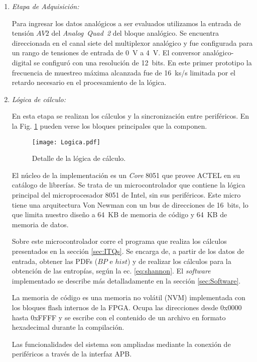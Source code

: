 \begin{enumerate}
	\item \textit{Etapa de Adquisición:}
	
	Para ingresar los datos analógicos a ser evaluados utilizamos la entrada de tensión $AV2$ del \textit{Analog~Quad~2} del bloque analógico.
	Se encuentra direccionada en el canal siete del multiplexor analógico y fue configurada para un rango de tensiones de entrada de 0~V a 4~V.
	El conversor analógico-digital se configuró con una resolución de 12~bits.
	En este primer prototipo la frecuencia de muestreo máxima alcanzada fue de 16~ks/s limitada por el retardo necesario en el procesamiento de la lógica.
	
	\item \textit{Lógica de cálculo:}
	
	En esta etapa se realizan los cálculos y la sincronización entre periféricos.
	En la Fig. \ref{fig:logica} pueden verse los bloques principales que la componen.
	\begin{figure}
		\centering
		\texttt{[image: Logica.pdf]}\\
		\caption{Detalle de la lógica de cálculo.}\label{fig:logica}
	\end{figure}
	
	El núcleo de la implementación es un \textit{Core} 8051 que provee ACTEL en su catálogo de librerías.
	Se trata de un microcontrolador que contiene la lógica principal del microprocesador 8051 de Intel, sin sus periféricos.
	Este micro tiene una arquitectura Von Newman con un bus de direcciones de 16~bits, lo que limita nuestro diseño a 64~KB de memoria de código y 64~KB de memoria de datos.
	
	Sobre este microcontrolador corre el programa que realiza los cálculos presentados en la sección \ref{sec:ITQs}.
	Se encarga de, a partir de los datos de entrada, obtener las PDFs ($BP$ e $hist$) y de realizar los cálculos para la obtención de las entropías, según la ec. \ref{eq:shannon}.
	El \textit{software} implementado se describe más detalladamente en la sección \ref{sec:Software}.
	
	La memoria de código es una memoria no volátil (NVM) implementada con los bloques flash internos de la FPGA.
	Ocupa las direcciones desde 0x0000 hasta 0xFFFF y se escribe con el contenido de un archivo en formato hexadecimal durante la compilación.
	
	Las funcionalidades del sistema son ampliadas mediante la conexión de periféricos a través de la interfaz APB.
	

\end{enumerate}
